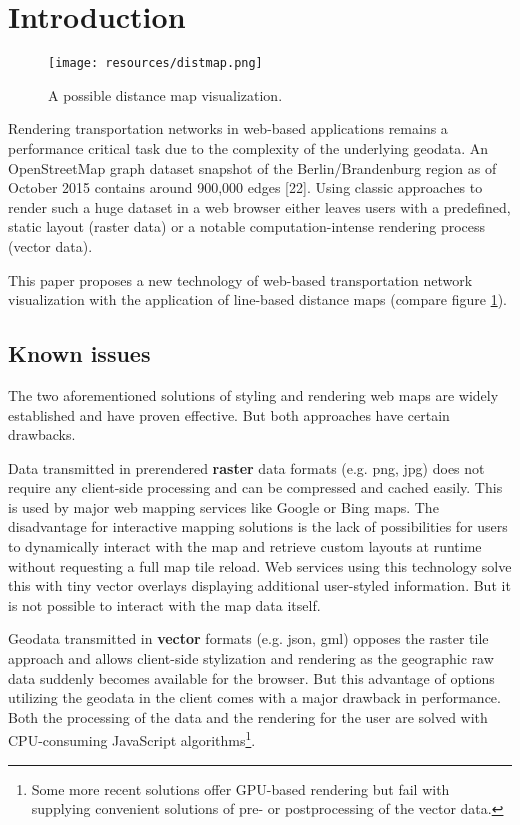 \documentclass{motivation}
\begin{document}


\section{Introduction}

  \begin{figure}[h]
    \centering
    \texttt{[image: resources/distmap.png]}
    \caption{A possible distance map visualization.}
    \label{fig:distmap}
  \end{figure}

  Rendering transportation networks in web-based applications remains a performance critical task due to the complexity of the underlying geodata. An OpenStreetMap graph dataset snapshot of the Berlin/Brandenburg region as of October 2015 contains around 900,000 edges [22]. Using classic approaches to render such a huge dataset in a web browser either leaves users with a predefined, static layout (raster data) or a notable computation-intense rendering process (vector data).\par
  This paper proposes a new technology of web-based transportation network visualization with the application of line-based distance maps (compare figure \ref{fig:distmap}).

\subsection{Known issues}
  The two aforementioned solutions of styling and rendering web maps are widely established and have proven effective. But both approaches have certain drawbacks.\par
  Data transmitted in prerendered \textbf{raster} data formats (e.g. png, jpg) does not require any client-side processing and can be compressed and cached easily. This is used by major web mapping services like Google or Bing maps. The disadvantage for interactive mapping solutions is the lack of possibilities for users to dynamically interact with the map and retrieve custom layouts at runtime without requesting a full map tile reload. Web services using this technology solve this with tiny vector overlays displaying additional user-styled information. But it is not possible to interact with the map data itself.\par
  Geodata transmitted in \textbf{vector} formats (e.g. json, gml) opposes the raster tile approach and allows client-side stylization and rendering as the geographic raw data suddenly becomes available for the browser. But this advantage of options utilizing the geodata in the client comes with a major drawback in performance. Both the processing of the data and the rendering for the user are solved with CPU-consuming JavaScript algorithms\footnote{Some more recent solutions offer GPU-based rendering but fail with supplying convenient solutions of pre- or postprocessing of the vector data.}.
\end{document}

